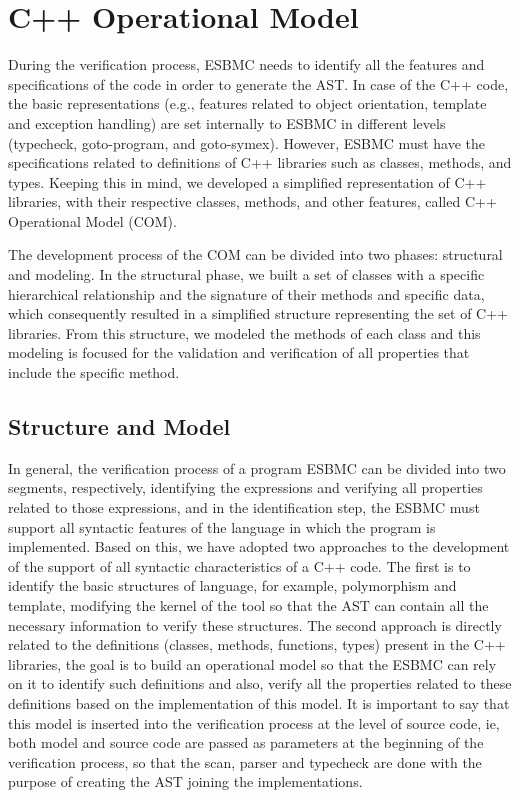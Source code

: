 \documentclass[a4paper]{llncs}
\begin{document}
\section{C++ Operational Model}
%
During the verification process, ESBMC needs to identify all the features and specifications of the code in order to generate the AST. 
In case of the C++ code, the basic representations (e.g., features related to object orientation, template and exception handling) are 
set internally to ESBMC in different levels (typecheck, goto-program, and goto-symex). However, ESBMC must have the specifications 
related to definitions of C++ libraries such as classes, methods, and types. Keeping this in mind, we developed a simplified representation 
of C++ libraries, with their respective classes, methods, and other features, called C++ Operational Model (COM).

The development process of the COM can be divided into two phases: structural and modeling. In the structural phase, we built a set 
of classes with a specific hierarchical relationship and the signature of their methods and specific data, which consequently resulted 
in a simplified structure representing the set of C++ libraries. From this structure, we modeled the methods of each class and this 
modeling is focused for the validation and verification of all properties that include the specific method.
%

\subsection{Structure and Model}
%
In general, the verification process of a program ESBMC can be divided into two segments, respectively, identifying the expressions and 
verifying all properties related to those expressions, and in the identification step, the ESBMC must support all syntactic features 
of the language in which the program is implemented. Based on this, we have adopted two approaches to the development of the support 
of all syntactic characteristics of a C++ code. The first is to identify the basic structures of language, for example, polymorphism 
and template, modifying the kernel of the tool so that the AST can contain all the necessary information to verify these structures. 
The second approach is directly related to the definitions (classes, methods, functions, types) present in the C++ libraries, the goal 
is to build an operational model so that the ESBMC can rely on it to identify such definitions and also, verify all the properties related 
to these definitions based on the implementation of this model. It is important to say that this model is inserted into the verification 
process at the level of source code, ie, both model and source code are passed as parameters at the beginning of the verification process, 
so that the scan, parser and typecheck are done with the purpose of creating the AST joining the implementations.
\end{document}
